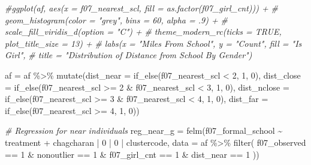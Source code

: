 \documentclass[
]{article}
\newenvironment{Shaded}{\begin{snugshade}}{\end{snugshade}}
\newcommand{\AttributeTok}[1]{\textcolor[rgb]{0.77,0.63,0.00}{#1}}
\newcommand{\CommentTok}[1]{\textcolor[rgb]{0.56,0.35,0.01}{\textit{#1}}}
\newcommand{\DecValTok}[1]{\textcolor[rgb]{0.00,0.00,0.81}{#1}}
\newcommand{\FunctionTok}[1]{\textcolor[rgb]{0.00,0.00,0.00}{#1}}
\newcommand{\NormalTok}[1]{#1}
\newcommand{\OtherTok}[1]{\textcolor[rgb]{0.56,0.35,0.01}{#1}}
\newcommand{\SpecialCharTok}[1]{\textcolor[rgb]{0.00,0.00,0.00}{#1}}
\begin{document}
\begin{Shaded}
\begin{Highlighting}[]
\CommentTok{\#ggplot(af, aes(x = f07\_nearest\_scl, fill = as.factor(f07\_girl\_cnt))) +}
\CommentTok{\#  geom\_histogram(color = "grey", bins = 60, alpha = .9) +}
\CommentTok{\#  scale\_fill\_viridis\_d(option = "C") +}
\CommentTok{\#  theme\_modern\_rc(ticks = TRUE, plot\_title\_size = 13) +}
\CommentTok{\#  labs(x = "Miles From School", y = "Count", fill = "Is Girl", }
\CommentTok{\#       title = "Distribution of Distance from School By Gender")}
\end{Highlighting}
\end{Shaded}

\begin{Shaded}
\begin{Highlighting}[]
\NormalTok{af }\OtherTok{=}\NormalTok{ af }\SpecialCharTok{\%\textgreater{}\%} \FunctionTok{mutate}\NormalTok{(}\AttributeTok{dist\_near =} \FunctionTok{if\_else}\NormalTok{(f07\_nearest\_scl }\SpecialCharTok{\textless{}} \DecValTok{2}\NormalTok{, }\DecValTok{1}\NormalTok{, }\DecValTok{0}\NormalTok{),}
               \AttributeTok{dist\_close =} \FunctionTok{if\_else}\NormalTok{(f07\_nearest\_scl }\SpecialCharTok{\textgreater{}=} \DecValTok{2} \SpecialCharTok{\&}\NormalTok{ f07\_nearest\_scl }\SpecialCharTok{\textless{}} \DecValTok{3}\NormalTok{, }\DecValTok{1}\NormalTok{, }\DecValTok{0}\NormalTok{),}
               \AttributeTok{dist\_nclose =} \FunctionTok{if\_else}\NormalTok{(f07\_nearest\_scl }\SpecialCharTok{\textgreater{}=} \DecValTok{3} \SpecialCharTok{\&}\NormalTok{ f07\_nearest\_scl }\SpecialCharTok{\textless{}} \DecValTok{4}\NormalTok{, }\DecValTok{1}\NormalTok{, }\DecValTok{0}\NormalTok{),}
               \AttributeTok{dist\_far =} \FunctionTok{if\_else}\NormalTok{(f07\_nearest\_scl }\SpecialCharTok{\textgreater{}=} \DecValTok{4}\NormalTok{, }\DecValTok{1}\NormalTok{, }\DecValTok{0}\NormalTok{))}

\CommentTok{\# Regression for near individuals}
\NormalTok{reg\_near\_g }\OtherTok{=} \FunctionTok{felm}\NormalTok{(f07\_formal\_school }\SpecialCharTok{\textasciitilde{}}\NormalTok{ treatment }\SpecialCharTok{+} 
\NormalTok{                   chagcharan }\SpecialCharTok{|} \DecValTok{0} \SpecialCharTok{|} \DecValTok{0} \SpecialCharTok{|}\NormalTok{ clustercode,}
         \AttributeTok{data =}\NormalTok{ af }\SpecialCharTok{\%\textgreater{}\%} \FunctionTok{filter}\NormalTok{( }
\NormalTok{                              f07\_observed }\SpecialCharTok{==} \DecValTok{1} \SpecialCharTok{\&}
\NormalTok{                              nonoutlier }\SpecialCharTok{==} \DecValTok{1} \SpecialCharTok{\&}
\NormalTok{                              f07\_girl\_cnt }\SpecialCharTok{==} \DecValTok{1} \SpecialCharTok{\&}
\NormalTok{                              dist\_near }\SpecialCharTok{==} \DecValTok{1}
\NormalTok{                              ))}


\end{Highlighting}
\end{Shaded}
\end{document}

